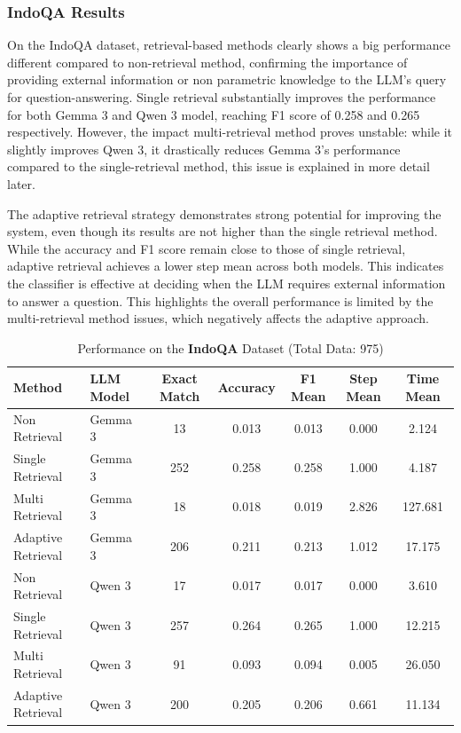 \documentclass[times]{iapress}
\begin{document}
\subsubsection{IndoQA Results}
On the IndoQA dataset, retrieval-based methods clearly shows a big performance different compared to non-retrieval method, confirming the importance of providing external information or non parametric knowledge to the LLM's query for question-answering. Single retrieval substantially improves the performance for both Gemma 3 and Qwen 3 model, reaching F1 score of 0.258 and 0.265 respectively. However, the impact multi-retrieval method proves unstable: while it slightly improves Qwen 3, it drastically reduces Gemma 3's performance compared to the single-retrieval method, this issue is explained in more detail later.

The adaptive retrieval strategy demonstrates strong potential for improving the system, even though its results are not higher than the single retrieval method. While the accuracy and F1 score remain close to those of single retrieval, adaptive retrieval achieves a lower step mean across both models. This indicates the classifier is effective at deciding when the LLM requires external information to answer a question. This highlights the overall performance is limited by the multi-retrieval method issues, which negatively affects the adaptive approach.

\begin{table}[htbp]
  \footnotesize
  \caption{Performance on the \textbf{IndoQA} Dataset (Total Data: 975)}
  \label{tab:indo_qa_performance}
  \begin{tabularx}{\textwidth}{@{}L L C C C C C@{}}
    \toprule
    \textbf{Method} & \textbf{LLM Model} & \textbf{Exact Match} & \textbf{Accuracy} & \textbf{F1 Mean} & \textbf{Step Mean} & \textbf{Time Mean} \\
    \midrule
    Non Retrieval & Gemma 3 & 13 & 0.013 & 0.013 & 0.000 & 2.124 \\
    Single Retrieval & Gemma 3 & 252 & 0.258 & 0.258 & 1.000 & 4.187 \\
    Multi Retrieval & Gemma 3 & 18 & 0.018 & 0.019 & 2.826 & 127.681 \\
    \midrule
    Adaptive Retrieval & Gemma 3 & 206 & 0.211 & 0.213 & 1.012 & 17.175 \\
    \midrule
    Non Retrieval & Qwen 3 & 17 & 0.017 & 0.017 & 0.000 & 3.610 \\
    Single Retrieval & Qwen 3 & 257 & 0.264 & 0.265 & 1.000 & 12.215 \\
    Multi Retrieval & Qwen 3 & 91 & 0.093 & 0.094 & 0.005 & 26.050 \\
    \midrule
    Adaptive Retrieval & Qwen 3 & 200 & 0.205 & 0.206 & 0.661 & 11.134 \\
    \bottomrule
  \end{tabularx}
\end{table}
\end{document}
